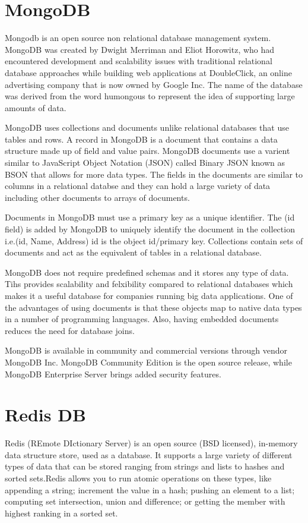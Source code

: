 \section {MongoDB}
Mongodb is an open source non relational database management system. MongoDB was created by Dwight Merriman and Eliot Horowitz, who had encountered development and scalability issues with traditional relational database approaches while building web applications at DoubleClick, an online advertising company that is now owned by Google Inc. The name of the database was derived from the word humongous to represent the idea of supporting large amounts of data.\newline

MongoDB uses collections and documents unlike relational databases that use tables and rows. A record in MongoDB is a document that contains a data structure made up of field and value pairs. MongoDB documents use a varient similar to JavaScript Object Notation (JSON) called Binary JSON known as BSON that allows for more data types. The fields in the documents are similar to columns in a relational databse and they can hold a large variety of data including other documents to arrays of documents.\newline

Documents in MongoDB must use a primary key as a unique identifier.
The (id field) is added by MongoDB to uniquely identify the document in the collection i.e.(id, Name, Address) id is the object id/primary key. Collections contain sets of documents and act as the equivalent of tables in a relational database.\newline

MongoDB does not require predefined schemas and it stores any type of data. Tihs provides scalability and felxibility compared to relational databases which makes it a useful database for companies running big data applications. One of the advantages of using documents is that these objects map to native data types in a number of programming languages. Also, having embedded documents reduces the need for database joins.\newline

MongoDB is available in community and commercial versions through vendor MongoDB Inc. MongoDB Community Edition is the open source release, while MongoDB Enterprise Server brings added security features.\newline
\cite{S174228761630031720160601}

\section {Redis DB}
Redis (REmote DIctionary Server) is an open source (BSD licensed), in-memory data structure store, used as a database. It supports a large variety of different types of data that can be stored ranging from strings and lists to hashes and sorted sets.Redis allows you to run atomic operations on these types, like appending a string; increment the value in a hash; pushing an element to a list; computing set intersection, union and difference; or getting the member with highest ranking in a sorted set.
\newline

